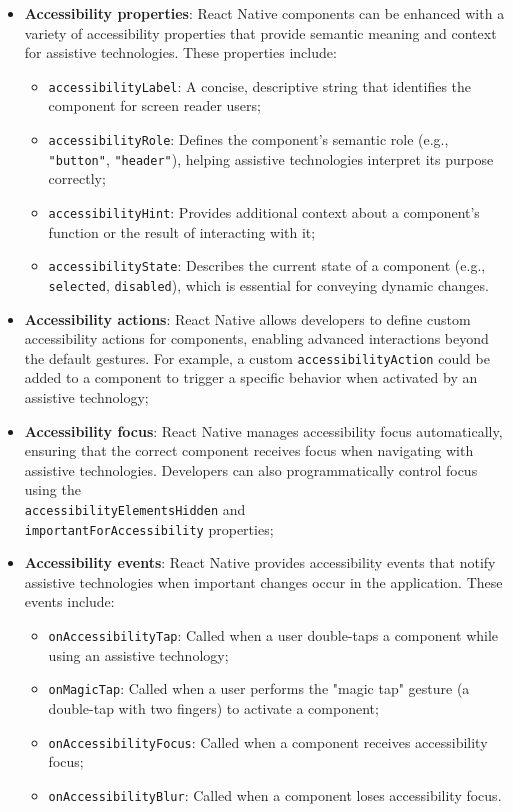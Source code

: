 \begin{itemize}
    \item \textbf{Accessibility properties}: React Native components can be enhanced with a variety of accessibility properties that provide semantic meaning and context for assistive technologies. These properties include:
    \begin{itemize}
        \item \texttt{accessibilityLabel}: A concise, descriptive string that identifies the component for screen reader users;
        \item \texttt{accessibilityRole}: Defines the component's semantic role (e.g., \texttt{"button"}, \texttt{"header"}), helping assistive technologies interpret its purpose correctly;
        \item \texttt{accessibilityHint}: Provides additional context about a component's function or the result of interacting with it;
        \item \texttt{accessibilityState}: Describes the current state of a component (e.g., \texttt{selected}, \texttt{disabled}), which is essential for conveying dynamic changes.
    \end{itemize}
    
    \item \textbf{Accessibility actions}: React Native allows developers to define custom accessibility actions for components, enabling advanced interactions beyond the default gestures. For example, a custom \texttt{accessibilityAction} could be added to a component to trigger a specific behavior when activated by an assistive technology;
    
    \item \textbf{Accessibility focus}: React Native manages accessibility focus automatically, ensuring that the correct component receives focus when navigating with assistive technologies. Developers can also programmatically control focus using the \\ \texttt{accessibilityElementsHidden} and \\\texttt{importantForAccessibility} properties;
    
    \item \textbf{Accessibility events}: React Native provides accessibility events that notify assistive technologies when important changes occur in the application. These events include:
    \begin{itemize}
        \item \texttt{onAccessibilityTap}: Called when a user double-taps a component while using an assistive technology;
        \item \texttt{onMagicTap}: Called when a user performs the "magic tap" gesture (a double-tap with two fingers) to activate a component;
        \item \texttt{onAccessibilityFocus}: Called when a component receives accessibility focus;
        \item \texttt{onAccessibilityBlur}: Called when a component loses accessibility focus.
    \end{itemize}
\end{itemize}

